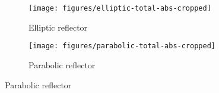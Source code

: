 \begin{figure}
  \centering
  \begin{subfigure}[b]{0.47\textwidth}
    \texttt{[image: figures/elliptic-total-abs-cropped]}
    \caption{Elliptic reflector}
    \label{fig:elliptic-distribution}
  \end{subfigure}
  \begin{subfigure}[b]{0.47\textwidth}
    \texttt{[image: figures/parabolic-total-abs-cropped]}
    \caption{Parabolic reflector}
    \label{fig:parabolic-distribution}
  \end{subfigure}

\end{figure}
